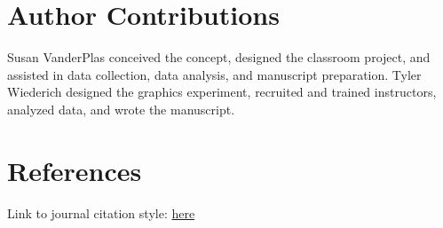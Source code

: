 \documentclass[
  12pt,
]{article}
\providecommand{\DIFdel}[1]{} %
\providecommand{\DIFadd}[1]{{\protect\color{blue} \sf #1}} %
\providecommand{\DIFdel}[1]{{\protect\color{red} [..\footnote{removed: #1} ]}} %
\providecommand{\DIFaddbegin}{} %
\providecommand{\DIFaddend}{} %
\providecommand{\DIFdelbegin}{} %
\providecommand{\DIFdelend}{} %
\newcommand{\DIFscaledelfig}{0.5}
\newlength{\DIFdelgraphicswidth} %
\newlength{\DIFdelgraphicsheight} %
\newcommand{\DIFaddincludegraphics}[2][]{{\color{blue}\fbox{\DIFOincludegraphics[#1]{#2}}}} %
\newcommand{\DIFdelincludegraphics}[2][]{%
\sbox{\DIFdelgraphicsbox}{\DIFOincludegraphics[#1]{#2}}%
\settoboxwidth{\DIFdelgraphicswidth}{\DIFdelgraphicsbox} %
\settoboxtotalheight{\DIFdelgraphicsheight}{\DIFdelgraphicsbox} %
\scalebox{\DIFscaledelfig}{%
\parbox[b]{\DIFdelgraphicswidth}{\usebox{\DIFdelgraphicsbox}\\[-\baselineskip] \rule{\DIFdelgraphicswidth}{0em}}\llap{\resizebox{\DIFdelgraphicswidth}{\DIFdelgraphicsheight}{%
\setlength{\unitlength}{\DIFdelgraphicswidth}%
\begin{picture}(1,1)%
\thicklines\linethickness{2pt} %
{\color[rgb]{1,0,0}\put(0,0){\framebox(1,1){}}}%
{\color[rgb]{1,0,0}\put(0,0){\line( 1,1){1}}}%
{\color[rgb]{1,0,0}\put(0,1){\line(1,-1){1}}}%
\end{picture}%
}\hspace*{3pt}}} %
} %
\DeclareRobustCommand{\DIFaddbegin}{\DIFOaddbegin \let\includegraphics\DIFaddincludegraphics} %
\DeclareRobustCommand{\DIFaddend}{\DIFOaddend \let\includegraphics\DIFOincludegraphics} %
\DeclareRobustCommand{\DIFdelbegin}{\DIFOdelbegin \let\includegraphics\DIFdelincludegraphics} %
\DeclareRobustCommand{\DIFdelend}{\DIFOaddend \let\includegraphics\DIFOincludegraphics} %
\begin{document}
\section{Author Contributions}\label{author-contributions}

Susan VanderPlas \DIFdelbegin \DIFdel{created the framework of the graphics project,
submitted documentation to the Institutional Review Board for approval, and provided contributions for the code used to collect responses}\DIFdelend \DIFaddbegin \DIFadd{conceived the concept, designed the classroom project,
and assisted in data collection, data analysis, and manuscript
preparation}\DIFaddend . Tyler Wiederich designed the \DIFdelbegin \DIFdel{experiment, wrote the code for administering the
experiment, }\DIFdelend \DIFaddbegin \DIFadd{graphics experiment, }\DIFaddend recruited
and trained instructors, analyzed data, and wrote the manuscript.

\section{References}\label{references}

Link to journal citation style:
\href{https://www.tandfonline.com/action/authorSubmission?show=instructions&journalCode=ujse21\#refs}{here}
\end{document}
